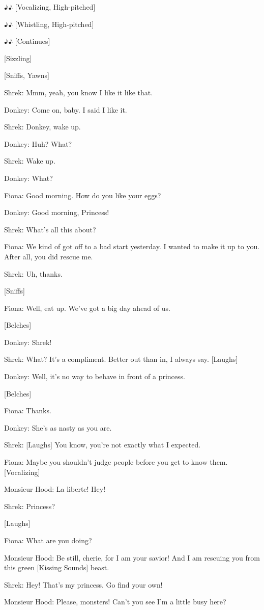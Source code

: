 \documentclass{article}
\begin{document}
♪♪ [Vocalizing, High-pitched]

♪♪ [Whistling, High-pitched]

♪♪ [Continues]

[Sizzling]

[Sniffs, Yawns]

Shrek:
Mmm, yeah, you know I like it like that.

Donkey:
Come on, baby. I said I like it.

Shrek:
Donkey, wake up.

Donkey:
Huh? What?

Shrek:
Wake up.

Donkey:
What?

Fiona:
Good morning. How do you like your eggs?

Donkey:
Good morning, Princess!

Shrek:
What's all this about?

Fiona:
We kind of got off to a bad start yesterday. I wanted to make it up to you. After all, you did rescue me.

Shrek:
Uh, thanks.

[Sniffs]

Fiona:
Well, eat up. We've got a big day ahead of us.

[Belches]

Donkey:
Shrek!

Shrek:
What? It's a compliment. Better out than in, I always say. [Laughs]

Donkey:
Well, it's no way to behave in front of a princess.

[Belches]

Fiona:
Thanks.

Donkey:
She's as nasty as you are.

Shrek:
[Laughs] You know, you're not exactly what I expected.

Fiona:
Maybe you shouldn't judge people before you get to know them. [Vocalizing]

Monsieur Hood:
La liberte! Hey!

Shrek:
Princess?

[Laughs]

Fiona:
What are you doing?

Monsieur Hood:
Be still, cherie, for I am your savior! And I am rescuing you from this green [Kissing Sounds] beast.

Shrek:
Hey! That's my princess. Go find your own!

Monsieur Hood:
Please, monsters! Can't you see I'm a little busy here?
\end{document}
